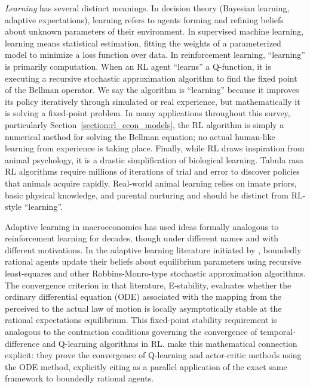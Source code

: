 \textit{Learning} has several distinct meanings. In decision theory (Bayesian learning, adaptive expectations), learning refers to agents forming and refining beliefs about unknown parameters of their environment. In supervised machine learning, learning means statistical estimation, fitting the weights of a parameterized model to minimize a loss function over data. In reinforcement learning, ``learning'' is primarily computation. When an RL agent ``learns'' a Q-function, it is executing a recursive stochastic approximation algorithm to find the fixed point of the Bellman operator. We say the algorithm is ``learning'' because it improves its policy iteratively through simulated or real experience, but mathematically it is solving a fixed-point problem. In many applications throughout this survey, particularly Section~\ref{section:rl_econ_models}, the RL algorithm is simply a numerical method for solving the Bellman equation; no actual human-like learning from experience is taking place. Finally, while RL draws inspiration from animal psychology, it is a drastic simplification of biological learning. Tabula rasa RL algorithms require millions of iterations of trial and error to discover policies that animals acquire rapidly. Real-world animal learning relies on innate priors, basic physical knowledge, and parental nurturing and should be distinct from RL-style ``learning''.

Adaptive learning in macroeconomics has used ideas formally analogous to reinforcement learning for decades, though under different names and with different motivations. In the adaptive learning literature initiated by \citet{MarcetSargent1989}, boundedly rational agents update their beliefs about equilibrium parameters using recursive least-squares and other Robbins-Monro-type stochastic approximation algorithms. The convergence criterion in that literature, E-stability, evaluates whether the ordinary differential equation (ODE) associated with the mapping from the perceived to the actual law of motion is locally asymptotically stable at the rational expectations equilibrium. This fixed-point stability requirement is analogous to the contraction conditions governing the convergence of temporal-difference and Q-learning algorithms in RL. \citet{borkar2000} make this mathematical connection explicit: they prove the convergence of Q-learning and actor-critic methods using the ODE method, explicitly citing \citet{Sargent1993} as a parallel application of the exact same framework to boundedly rational agents.

